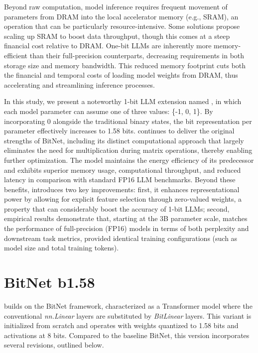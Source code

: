 Beyond raw computation, model inference requires frequent movement of parameters from DRAM into the local accelerator memory (e.g., SRAM), an operation that can be particularly resource-intensive. Some solutions propose scaling up SRAM to boost data throughput, though this comes at a steep financial cost relative to DRAM. One-bit LLMs are inherently more memory-efficient than their full-precision counterparts, decreasing requirements in both storage size and memory bandwidth. This reduced memory footprint cuts both the financial and temporal costs of loading model weights from DRAM, thus accelerating and streamlining inference processes.

In this study, we present a noteworthy 1-bit LLM extension named \textbf{}, in which each model parameter can assume one of three values: \{-1, 0, 1\}. By incorporating 0 alongside the traditional binary states, the bit representation per parameter effectively increases to 1.58 bits.  continues to deliver the original strengths of BitNet, including its distinct computational approach that largely eliminates the need for multiplication during matrix operations, thereby enabling further optimization. The model maintains the energy efficiency of its predecessor and exhibits superior memory usage, computational throughput, and reduced latency in comparison with standard FP16 LLM benchmarks. Beyond these benefits,  introduces two key improvements: first, it enhances representational power by allowing for explicit feature selection through zero-valued weights, a property that can considerably boost the accuracy of 1-bit LLMs; second, empirical results demonstrate that, starting at the 3B parameter scale,  matches the performance of full-precision (FP16) models in terms of both perplexity and downstream task metrics, provided identical training configurations (such as model size and total training tokens).

\section{BitNet b1.58}

 builds on the BitNet framework, characterized as a Transformer model where the conventional \emph{nn.Linear} layers are substituted by \emph{BitLinear} layers. This variant is initialized from scratch and operates with weights quantized to 1.58 bits and activations at 8 bits. Compared to the baseline BitNet, this version incorporates several revisions, outlined below.

